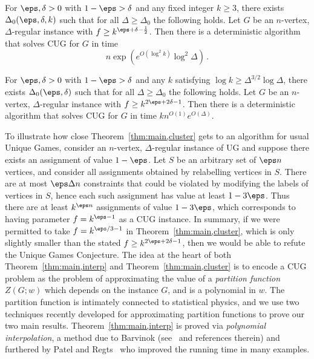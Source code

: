 \begin{theorem}\label{thm:main,interp}
For $\eps,\delta>0$ with $1-\eps > \delta$ and any fixed integer $k\ge 3$, there exists $\Delta_0(\eps,\delta,k)$ such that for all $\Delta\ge\Delta_0$ the following holds. 
%
Let $G$ be an $n$-vertex, $\Delta$-regular  instance with $f \ge k^{\eps+\delta-\frac{1}{2}}$.  
Then there is a deterministic algorithm that solves CUG for $G$ in time
\[
n\exp\left(e^{O(\log^2 k)} \log^2\Delta\right)\,.
\]
\end{theorem}
%
\begin{theorem}\label{thm:main,cluster}
For $\eps,\delta>0$ with $1-\eps > \delta$ and any $k$ satisfying $\log k\ge \Delta^{3/2}\log\Delta$, there exists $\Delta_0(\eps,\delta)$ such that for all $\Delta\ge\Delta_0$ the following holds. 
%
Let $G$ be an $n$-vertex, $\Delta$-regular  instance with $f\ge k^{2\eps+2\delta-1}$.
Then there is a deterministic algorithm that solves CUG for $G$ in time $kn^{O(1)}e^{O(\Delta)}$.
\end{theorem}
%
To illustrate how close Theorem~\ref{thm:main,cluster} gets to an algorithm for usual Unique Games, consider an $n$-vertex, $\Delta$-regular instance of UG and suppose there exists an assignment of value $1-\eps$. 
Let $S$ be an arbitrary set of $\eps n$ vertices, and consider all assignments obtained by relabelling vertices in $S$. 
There are at most $\eps\Delta n$ constraints that could be violated by modifying the labels of vertices in $S$, hence each such assignment has value at least $1-3\eps$.
Thus there are at least $k^{\eps n}$ assignments of value $1-3\eps$, which corresponds to having parameter $f=k^{\eps-1}$ as a CUG instance. 
In summary, if we were permitted to take $f=k^{\eps/3-1}$ in Theorem~\ref{thm:main,cluster}, which is only slightly smaller than the stated $f\ge k^{2\eps+2\delta-1}$, then we would be able to refute the Unique Games Conjecture.
%
The idea at the heart of both Theorem~\ref{thm:main,interp} and Theorem~\ref{thm:main,cluster} is to encode a CUG problem as the problem of approximating the value of a \emph{partition function} $Z(G;w)$ which depends on the instance $G$, and is a polynomial in $w$. 
The partition function is intimately connected to statistical physics, and we use two techniques recently developed for approximating partition functions to prove our two main results. 
Theorem~\ref{thm:main,interp} is proved via \emph{polynomial interpolation}, a method due to Barvinok (see~\cite{Barvinok16} and references therein) and furthered by Patel and Regts~\cite{PR17} who improved the running time in many examples.
